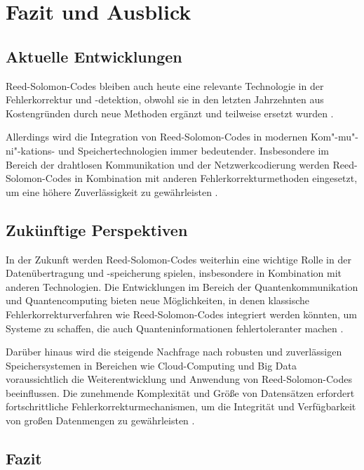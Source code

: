 \chapter{Fazit und Ausblick}\label{ch:summary}

\section{Aktuelle Entwicklungen}

Reed-Solomon-Codes bleiben auch heute eine relevante Technologie in der Fehlerkorrektur und -detektion, obwohl sie in den letzten Jahrzehnten aus Kostengründen durch neue Methoden ergänzt und teilweise ersetzt wurden \cite{ilievAnalysisEvaluationReedSolomon2008}. 

Allerdings wird die Integration von Reed-Solomon-Codes in modernen Kom"-mu"-ni"-kations- und Speichertechnologien immer bedeutender.
Insbesondere im Bereich der drahtlosen Kommunikation und der Netzwerkcodierung werden Reed-Solomon-Codes in Kombination mit anderen Fehlerkorrekturmethoden eingesetzt, um eine höhere Zuverlässigkeit zu gewährleisten \cite[\mbox{Kapitel 1}]{conOptimalTwoDimensionalReed2024}.

\section{Zukünftige Perspektiven}

In der Zukunft werden Reed-Solomon-Codes weiterhin eine wichtige Rolle in der Datenübertragung und -speicherung spielen, insbesondere in Kombination mit anderen Technologien. 
Die Entwicklungen im Bereich der Quantenkommunikation und Quantencomputing bieten neue Möglichkeiten, in denen klassische Fehlerkorrekturverfahren wie Reed-Solomon-Codes integriert werden könnten, um Systeme zu schaffen, die auch Quanteninformationen fehlertoleranter machen \cite{grasslQuantumReedSolomonCodes1999}.

Darüber hinaus wird die steigende Nachfrage nach robusten und zuverlässigen Speichersystemen in Bereichen wie Cloud-Computing und Big Data voraussichtlich die Weiterentwicklung und Anwendung von Reed-Solomon-Codes beeinflussen. 
Die zunehmende Komplexität und Größe von Datensätzen erfordert fortschrittliche Fehlerkorrekturmechanismen, um die Integrität und Verfügbarkeit von großen Datenmengen zu gewährleisten \cite[Kapitel 5]{sathiamoorthyXORingElephantsNovel2013}.

\section{Fazit}

